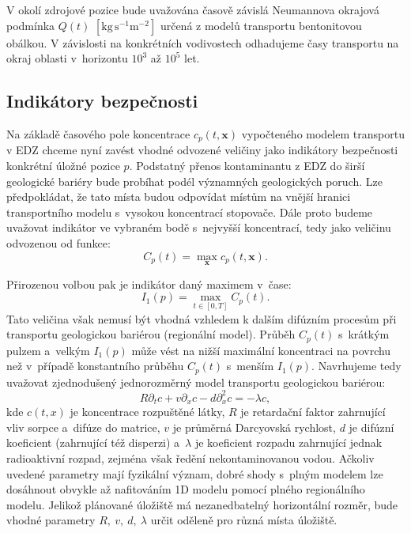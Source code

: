 \documentclass{article}
\def\unit#1{\mathrm{#1}}
\def\vc#1{\mathbf{\boldsymbol{#1}}}     %
\begin{document}
V okolí zdrojové pozice bude uvažována časově závislá Neumannova okrajová podmínka $Q(t)$ $[\unit{kg\, s^{-1}m^{-2}}]$
určená z modelů transportu bentonitovou obálkou. V závislosti na konkrétních vodivostech odhadujeme časy 
transportu na okraj oblasti v~horizontu $10^3$ až $10^5$ let. 



\subsection{Indikátory bezpečnosti}
\label{sec:indikatory}
Na základě časového pole koncentrace $c_p(t, \vc x)$ vypočteného modelem transportu v EDZ chceme nyní zavést vhodné odvozené veličiny jako indikátory bezpečnosti konkrétní úložné pozice $p$. Podstatný přenos kontaminantu z EDZ do širší geologické bariéry bude probíhat podél významných geologických poruch. 
Lze předpokládat, že tato místa budou odpovídat místům na vnější hranici transportního modelu s~vysokou koncentrací stopovače. 
Dále proto budeme uvažovat indikátor ve vybraném bodě s~nejvyšší koncentrací, tedy jako veličinu odvozenou od funkce:
\[
  C_p(t) = \max_{\vc x} c_p(t, \vc x).
\]

Přirozenou volbou pak je indikátor daný maximem v~čase:
\begin{equation}
    I_1(p)  = \max_{t\in[0, T]} C_p(t).
\end{equation}
Tato veličina však nemusí být vhodná vzhledem k dalším difúzním procesům při transportu geologickou bariérou (regionální model).
Průběh $C_p(t)$ s~krátkým pulzem a~velkým $I_1(p)$ může vést na nižší maximální koncentraci na povrchu než v~případě konstantního průběhu $C_p(t)$ s~menším  $I_1(p)$. Navrhujeme tedy uvažovat zjednodušený jednorozměrný model transportu geologickou bariérou:
\begin{equation}
    \label{eq:ad}
    R\partial_t c + v \partial_x c - d \partial^2_x c = - \lambda c,
\end{equation}
kde $c(t,x)$ je koncentrace rozpuštěné látky, $R$ je retardační faktor zahrnující vliv sorpce a~difúze do matrice, $v$ je průměrná Darcyovská rychlost, $d$ je difúzní koeficient (zahrnující též disperzi) a~$\lambda$ je koeficient rozpadu zahrnující jednak radioaktivní rozpad, zejména však ředění nekontaminovanou vodou. Ačkoliv uvedené parametry mají fyzikální význam, dobré shody s~plným modelem lze dosáhnout obvykle až nafitováním 1D modelu pomocí plného regionálního modelu. Jelikož plánované úložiště má nezanedbatelný horizontální rozměr, bude vhodné parametry $R,\ v,\ d,\ \lambda$ určit 
oděleně pro různá místa úložiště. 
\end{document}
